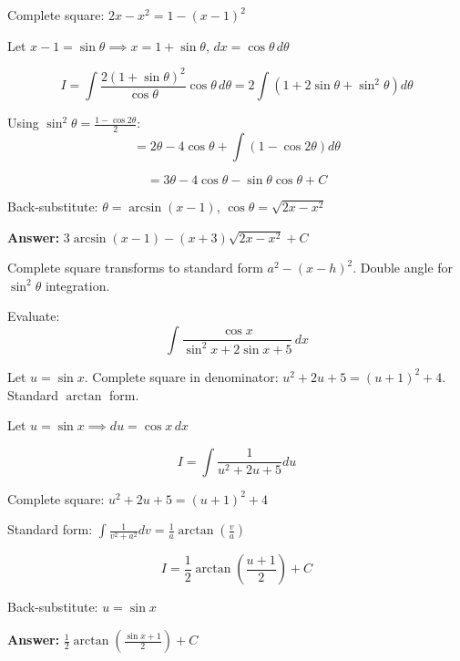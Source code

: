 \begin{solution}
Complete square: $2x-x^2 = 1-(x-1)^2$

Let $x-1 = \sin\theta \implies x = 1+\sin\theta$, $dx = \cos\theta \, d\theta$

\[
I = \int \frac{2(1+\sin\theta)^2}{\cos\theta} \cos\theta \, d\theta = 2\int (1+2\sin\theta+\sin^2\theta) d\theta
\]

Using $\sin^2\theta = \frac{1-\cos 2\theta}{2}$:
\[
= 2\theta - 4\cos\theta + \int(1-\cos 2\theta)d\theta
\]

\[
= 3\theta - 4\cos\theta - \sin\theta\cos\theta + C
\]

Back-substitute: $\theta = \arcsin(x-1)$, $\cos\theta = \sqrt{2x-x^2}$

\textbf{Answer:} $\boxed{3\arcsin(x-1) - (x+3)\sqrt{2x-x^2} + C}$
\end{solution}

\begin{takeaways}
Complete square transforms to standard form $a^2 - (x-h)^2$. Double angle for $\sin^2\theta$ integration.
\end{takeaways}

\vspace{1cm}

\begin{problem}
Evaluate:
\[
\int \frac{\cos x}{\sin^2 x + 2 \sin x + 5} \, dx
\]
\end{problem}

\begin{hint}
Let $u = \sin x$. Complete square in denominator: $u^2 + 2u + 5 = (u+1)^2 + 4$. Standard $\arctan$ form.
\end{hint}

\begin{solution}
Let $u = \sin x \implies du = \cos x \, dx$

\[
I = \int \frac{1}{u^2+2u+5} du
\]

Complete square: $u^2+2u+5 = (u+1)^2 + 4$

Standard form: $\int \frac{1}{v^2+a^2} dv = \frac{1}{a}\arctan\left(\frac{v}{a}\right)$

\[
I = \frac{1}{2}\arctan\left(\frac{u+1}{2}\right) + C
\]

Back-substitute: $u = \sin x$

\textbf{Answer:} $\boxed{\frac{1}{2}\arctan\left(\frac{\sin x + 1}{2}\right) + C}$
\end{solution}


